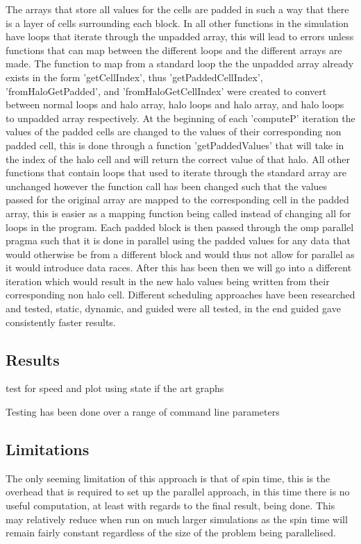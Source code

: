 \documentclass[paper=a4, fontsize=11pt]{scrartcl}
\numberwithin{equation}{section}		%
\numberwithin{figure}{section}			%
\numberwithin{table}{section}				%
\begin{document}
The arrays that store all values for the cells are padded in such a way that there is a layer of cells surrounding each block. In all other functions in the simulation have loops that iterate through the unpadded array, this will lead to errors unless functions that can map between the different loops and the different arrays are made. The function to map from a standard loop the the unpadded array already exists in the form 'getCellIndex', thus 'getPaddedCellIndex', 'fromHaloGetPadded', and 'fromHaloGetCellIndex' were created to convert between normal loops and halo array, halo loops and halo array, and halo loops to unpadded array respectively. At the beginning of each 'computeP' iteration the values of the padded cells are changed to the values of their corresponding non padded cell, this is done through a function 'getPaddedValues' that will take in the index of the halo cell and will return the correct value of that halo. All other functions that contain loops that used to iterate through the standard array are unchanged however the function call has been changed such that the values passed for the original array are mapped to the corresponding cell in the padded array, this is easier as a mapping function being called instead of changing all for loops in the program. Each padded block is then passed through the omp parallel pragma such that it is done in parallel using the padded values for any data that would otherwise be from a different block and would thus not allow for parallel as it would introduce data races. After this has been then we will go into a different iteration which would result in the new halo values being written from their corresponding non halo cell. Different scheduling approaches have been researched and tested, static, dynamic, and guided were all tested, in the end guided gave consistently faster results.

\subsection{Results}

test for speed and plot using state if the art graphs

Testing has been done over a range of command line parameters

\subsection{Limitations}

The only seeming limitation of this approach is that of spin time, this is the overhead that is required to set up the parallel approach, in this time there is no useful computation, at least with regards to the final result, being done. This may relatively reduce when run on much larger simulations as the spin time will remain fairly constant regardless of the size of the problem being parallelised. 

\end{document}

